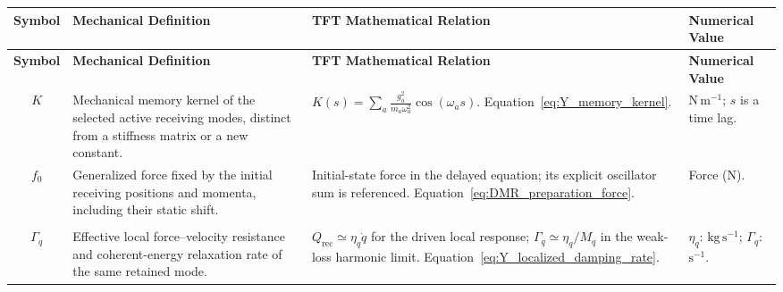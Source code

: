 \vspace{0.5cm}
\noindent
\renewcommand{\arraystretch}{1.6}
\begin{longtable}{@{} c p{5.5cm} p{4cm} p{3.5cm} @{}}
\toprule
\textbf{Symbol} & {\raggedright \textbf{Mechanical Definition}\par} & {\raggedright \textbf{TFT Mathematical Relation}\par} & {\raggedright \textbf{Numerical Value}\par} \\
\midrule
\endfirsthead

\toprule
\textbf{Symbol} & {\raggedright \textbf{Mechanical Definition}\par} & {\raggedright \textbf{TFT Mathematical Relation}\par} & {\raggedright \textbf{Numerical Value}\par} \\
\midrule
\endhead

$K$ & {\raggedright Mechanical memory kernel of the selected active receiving modes, distinct from a stiffness matrix or a new constant.\par} & {\raggedright $K(s)=\sum_a\frac{g_a^2}{m_a\omega_a^2}\cos(\omega_as)$. \newline Equation~\eqref{eq:Y_memory_kernel}.\par} & {\raggedright $\mathrm{N\,m^{-1}}$; $s$ is a time lag.\par} \\

$f_0$ & {\raggedright Generalized force fixed by the initial receiving positions and momenta, including their static shift.\par} & {\raggedright Initial-state force in the delayed equation; its explicit oscillator sum is referenced. \newline Equation~\eqref{eq:DMR_preparation_force}.\par} & {\raggedright Force ($\mathrm N$).\par} \\

\begin{tabular}[c]{@{}c@{}}$\eta_q$ \\ $\Gamma_q$\end{tabular} & {\raggedright Effective local force--velocity resistance and coherent-energy relaxation rate of the same retained mode.\par} & {\raggedright $Q_{\mathrm{rec}}\simeq\eta_q\dot q$ for the driven local response; $\Gamma_q\simeq\eta_q/M_q$ in the weak-loss harmonic limit. \newline Equation~\eqref{eq:Y_localized_damping_rate}.\par} & {\raggedright $\eta_q$: $\mathrm{kg\,s^{-1}}$; $\Gamma_q$: $\mathrm{s^{-1}}$.\par} \\


\end{longtable}
